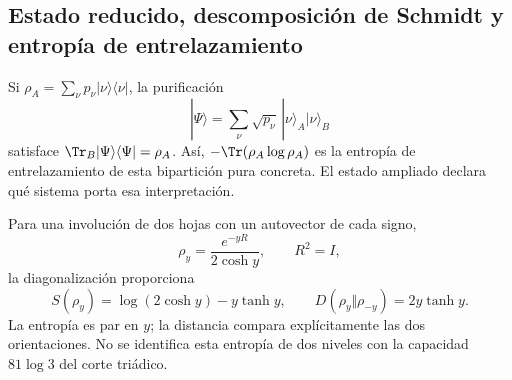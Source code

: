 

\subsection{Estado reducido, descomposición de Schmidt y entropía de entrelazamiento}
Si $\rho_A=\sum_\nu p_\nu|\nu\rangle\langle\nu|$,
la purificación
\[
|\Psi\rangle=\sum_\nu\sqrt{p_\nu}\,
|\nu\rangle_A|\nu\rangle_B
\]
satisface $\Tr_B|\Psi\rangle\langle\Psi|=\rho_A$.
Así, $-\Tr(\rho_A\log\rho_A)$ es la entropía de entrelazamiento
de esta bipartición pura concreta. El estado ampliado declara
qué sistema porta esa interpretación.

Para una involución de dos hojas con un autovector de cada signo,
\[
\rho_y=\frac{e^{-yR}}{2\cosh y},\qquad R^2=I,
\]
la diagonalización proporciona
\[
S(\rho_y)=\log(2\cosh y)-y\tanh y,\qquad
D(\rho_y\Vert\rho_{-y})=2y\tanh y.
\]
La entropía es par en $y$; la distancia compara explícitamente
las dos orientaciones. No se identifica esta entropía de dos niveles
con la capacidad $81\log3$ del corte triádico.
